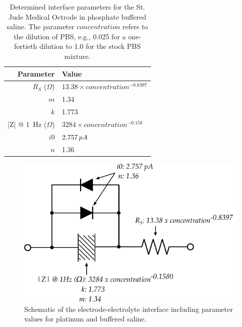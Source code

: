       \begin{table}
        \caption{Determined interface parameters for the St. Jude Medical Octrode in phosphate buffered saline. The parameter $concentration$ refers to the dilution of PBS, e.g., 0.025 for a one-fortieth dilution to 1.0 for the stock PBS mixture.}
        \label{tab:ModelParameters}
        \begin{center}
          \begin{tabular}{r | l}
              Parameter & Value \\
              \hline

              $R_{S}$ ($\Omega$)& $13.38 \times concentration^{-0.8397}$ \\

              $m$& 1.34\\
              $k$ & 1.773\\
              |Z| @ \SI{1}{\hertz} ($\Omega$)& $3284 \times concentration^{-0.158}$ \\

              $i0$ & $2.757\thinspace pA$\\
              $n$ & 1.36\\
          \end{tabular}
        \end{center}
      \end{table}

      \begin{figure}
        \centering
        \includegraphics{content/pt2/08-InterfaceParameters/graphics/interfaceSchematic_PBS_Solved}
        \caption{\label{fig:interfaceSchematic_PBS_Solved} Schematic of the electrode-electrolyte interface including parameter values for platinum and buffered saline.}
      \end{figure}

